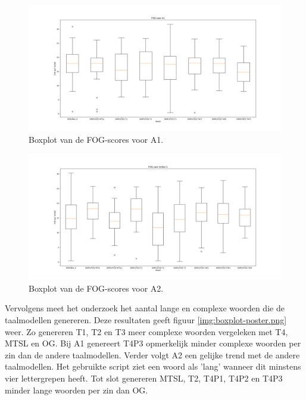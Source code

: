 \begin{figure}[H]
	\includegraphics[width=\linewidth]{img/boxplot-fog-a1.png}
	\caption{Boxplot van de FOG-scores voor A1.}
	\label{img:boxplot-fog-a1}
\end{figure}

\begin{figure}[H]
	\includegraphics[width=\linewidth]{img/boxplot-fog-a2.png}
	\caption{Boxplot van de FOG-scores voor A2.}
	\label{img:boxplot-fog-a2}
\end{figure}

Vervolgens meet het onderzoek het aantal lange en complexe woorden die de taalmodellen genereren. Deze resultaten geeft figuur \ref{img:boxplot-poster.png} weer. Zo genereren T1, T2 en T3 meer complexe woorden vergeleken met T4, MTSL en OG. Bij A1 genereert T4P3 opmerkelijk minder complexe woorden per zin dan de andere taalmodellen. Verder volgt A2 een gelijke trend met de andere taalmodellen. Het gebruikte script ziet een woord als 'lang' wanneer dit minstens vier lettergrepen heeft. Tot slot genereren MTSL, T2, T4P1, T4P2 en T4P3 minder lange woorden per zin dan OG.

